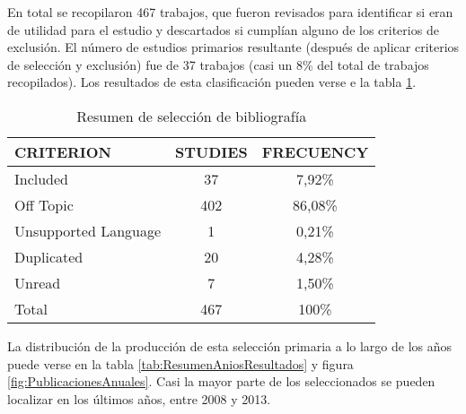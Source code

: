 
En total se recopilaron 467 trabajos, que fueron revisados para identificar si eran de utilidad para el estudio y descartados si cumplían alguno de los criterios de exclusión. El número de estudios primarios resultante (después de aplicar criterios de selección y exclusión) fue de 37 trabajos (casi un 8\% del total de trabajos recopilados). Los resultados de esta clasificación pueden verse e la tabla \ref{tab:ResumenSelecccionResultados}.

\begin{table}[H]
  \begin{center}
  \begin{tabular}{| m{4cm} | c | c |}
    \hline
    CRITERION & STUDIES & FRECUENCY\\
    \hline
    \hline 
    Included & 37 & 7,92\% \\
    \hline
    Off Topic & 402 & 86,08\% \\
    \hline
    Unsupported Language & 1 & 0,21\% \\
    \hline
    Duplicated & 20 & 4,28\% \\
    \hline
    Unread & 7 & 1,50\% \\
    \hline
    Total & 467 & 100\% \\
    \hline
  \end{tabular}
\end{center}
\caption{Resumen de selección de bibliografía}
\label{tab:ResumenSelecccionResultados}
\end{table} 



La distribución de la producción de esta selección primaria a lo largo de los años puede verse en la tabla \ref{tab:ResumenAniosResultados} y figura \ref{fig:PublicacionesAnuales}. Casi la mayor parte de los seleccionados se pueden localizar en los últimos años, entre 2008 y 2013.


